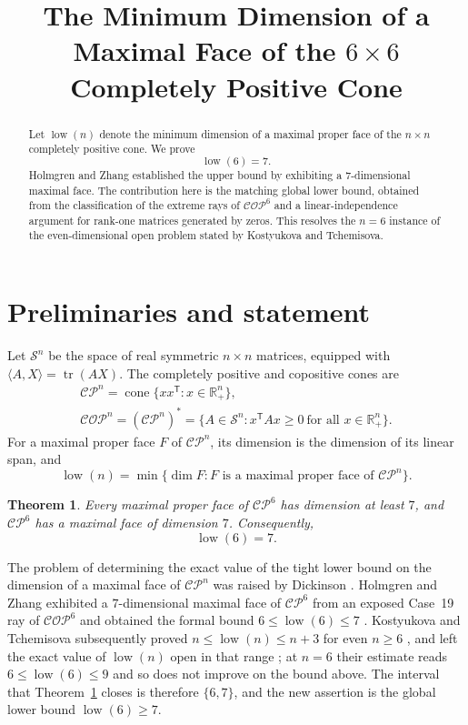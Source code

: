 \documentclass[11pt]{amsart}
\title[The minimum dimension in $\CP^6$]
{The Minimum Dimension of a Maximal Face of the
$6\times6$ Completely Positive Cone}
\date{}
\newtheorem{theorem}{Theorem}
\theoremstyle{remark}
\newcommand{\CP}{\mathcal{CP}}
\newcommand{\COP}{\mathcal{COP}}
\newcommand{\Smat}{\mathcal{S}}
\newcommand{\R}{\mathbb{R}}
\newcommand{\low}{\operatorname{low}}
\newcommand{\cone}{\operatorname{cone}}
\newcommand{\ip}[2]{\langle #1,#2\rangle}
\begin{document}
\begin{abstract}
Let $\low(n)$ denote the minimum dimension of a maximal proper face of the
$n\times n$ completely positive cone. We prove
\[
\low(6)=7.
\]
Holmgren and Zhang established the upper bound by exhibiting a
$7$-dimensional maximal face. The contribution here is the matching global
lower bound, obtained from the classification of the extreme rays of
$\COP^6$ and a linear-independence argument for rank-one matrices generated
by zeros. This resolves the $n=6$ instance of the even-dimensional open
problem stated by Kostyukova and Tchemisova.
\end{abstract}

\maketitle

\section{Preliminaries and statement}

Let $\Smat^n$ be the space of real symmetric $n\times n$ matrices, equipped
with $\ip{A}{X}=\operatorname{tr}(AX)$. The completely positive and
copositive cones are
\begin{gather*}
\CP^n=\cone\{xx^{\mathsf T}:x\in\R_+^n\},\\
\COP^n=(\CP^n)^*
 =\{A\in\Smat^n:x^{\mathsf T}Ax\ge0\ \text{for all }x\in\R_+^n\}.
\end{gather*}
For a maximal proper face $F$ of $\CP^n$, its dimension is the dimension of
its linear span, and
\[
\low(n)=\min\{\dim F:F\text{ is a maximal proper face of }\CP^n\}.
\]

\begin{theorem}\label{thm:main}
Every maximal proper face of $\CP^6$ has dimension at least $7$, and
$\CP^6$ has a maximal face of dimension $7$. Consequently,
\[
\low(6)=7.
\]
\end{theorem}

The problem of determining the exact value of the tight lower bound on the
dimension of a maximal face of $\CP^n$ was raised by Dickinson
\cite{Dickinson}. Holmgren and Zhang exhibited a $7$-dimensional maximal
face of $\CP^6$ from an exposed Case~19 ray of $\COP^6$ and obtained the
formal bound $6\le\low(6)\le7$
\cite[Lemma~4.7 and Theorems~4.8--4.9]{HZ}. Kostyukova and Tchemisova subsequently proved $n\le\low(n)\le n+3$ for even
$n\ge6$ \cite{KT}, and left the exact value of $\low(n)$ open in that range
\cite[Section~5]{KT}; at $n=6$ their estimate reads $6\le\low(6)\le9$ and so
does not improve on the bound above. The interval that
Theorem~\ref{thm:main} closes is therefore $\{6,7\}$, and the new assertion
is the global lower bound $\low(6)\ge7$.
\end{document}
